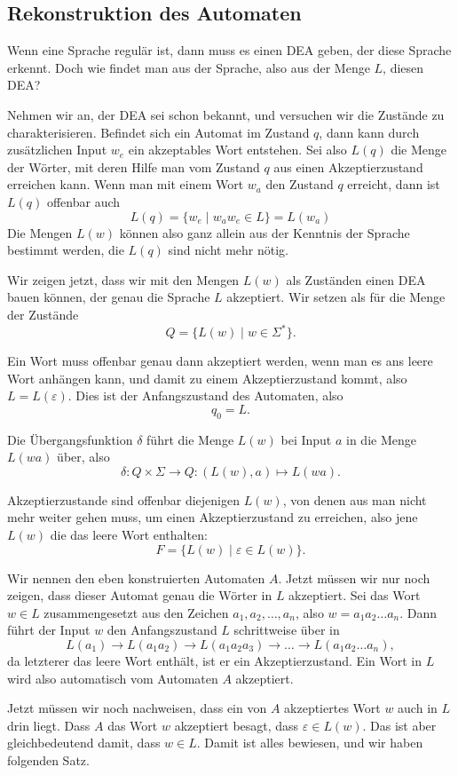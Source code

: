 \subsection{Rekonstruktion des Automaten\label{regulaer:rekonstruktion}}
Wenn eine Sprache regulär ist, dann muss es einen DEA geben, der
diese Sprache erkennt.
Doch wie findet man aus der Sprache, also aus der Menge $L$, diesen DEA?

Nehmen wir an, der DEA sei schon bekannt, und versuchen wir
die Zustände zu charakterisieren.
Befindet sich ein Automat im Zustand $q$, dann kann durch zusätzlichen
Input $w_e$ ein akzeptables Wort entstehen.
Sei also $L(q)$ die Menge der Wörter, mit deren Hilfe man vom Zustand $q$
aus einen Akzeptierzustand erreichen kann.
Wenn man mit einem Wort $w_a$ den Zustand $q$ erreicht, dann ist $L(q)$
offenbar auch
\[
L(q)=\{ w_e\;|\; w_aw_e \in L\}= L(w_a)
\]
Die Mengen $L(w)$ können also ganz allein aus der Kenntnis der
Sprache bestimmt werden, die $L(q)$ sind nicht mehr nötig.

Wir zeigen jetzt, dass wir mit den Mengen $L(w)$ als Zuständen einen
DEA bauen können, der genau die Sprache $L$ akzeptiert.
Wir setzen als für die Menge der Zustände 
\[
Q=\{L(w)\;|\;w\in\Sigma^*\}.
\]

Ein Wort muss offenbar genau dann akzeptiert werden, wenn
man es ans leere Wort anhängen kann, und damit zu einem Akzeptierzustand
kommt, also $L=L(\varepsilon)$.
Dies ist der Anfangszustand des Automaten, also
\[
q_0=L.
\]

Die Übergangsfunktion $\delta$ führt die Menge $L(w)$ bei Input
$a$ in die Menge $L(wa)$ über, also
\[
\delta \colon Q\times\Sigma\to Q:(L(w),a)\mapsto L(wa).
\]

Akzeptierzustande sind offenbar diejenigen $L(w)$, von denen
aus man nicht mehr weiter gehen muss, um einen Akzeptierzustand
zu erreichen, also jene $L(w)$ die das leere Wort enthalten:
\[
F=\{L(w)\;|\;\varepsilon\in L(w)\}.
\]

Wir nennen den eben konstruierten Automaten $A$.
Jetzt müssen wir nur noch zeigen, dass dieser Automat genau die
Wörter in $L$ akzeptiert.
Sei das Wort $w\in L$ zusammengesetzt aus den
Zeichen $a_1,a_2,\dots,a_n$, also $w=a_1a_2\dots a_n$.
Dann führt der Input $w$ den Anfangszustand $L$ schrittweise über in
\[
L(a_1)\to L(a_1a_2)\to L(a_1a_2a_3)\to \dots \to L(a_1a_2\dots a_n),
\]
da letzterer das leere Wort enthält, ist er ein Akzeptierzustand.
Ein Wort in $L$ wird also automatisch vom Automaten $A$ akzeptiert.

Jetzt müssen wir noch nachweisen, dass ein von $A$ akzeptiertes Wort $w$
auch in $L$ drin liegt.
Dass $A$ das Wort $w$ akzeptiert besagt, dass $\varepsilon \in L(w)$.
Das ist aber gleichbedeutend damit, dass $w\in L$.
Damit ist alles bewiesen, und wir haben folgenden Satz.

